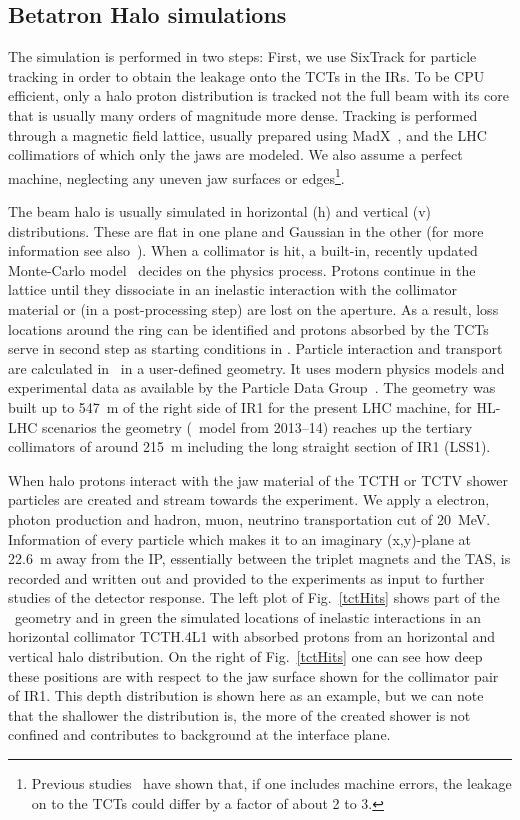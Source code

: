\subsection{Betatron Halo simulations}
The simulation is performed in two steps: First, we use SixTrack for particle tracking in order to obtain the leakage onto the TCTs in the IRs. To be CPU efficient, only a halo proton distribution is tracked not the full beam with its core that is usually many orders of magnitude more dense. Tracking is performed through a magnetic field lattice, usually prepared using MadX~\cite{madx}, and the LHC collimatiors of which only the jaws are modeled. We also assume a perfect machine, neglecting any uneven jaw surfaces or edges\footnote{Previous studies~\cite{roderikSimMeasPaper} have shown that, if one includes machine errors, the leakage on to the TCTs could differ by a factor of about 2 to 3.}.

The beam halo is usually simulated in horizontal (h) and vertical (v) distributions. These are flat in one plane and Gaussian in the other (for more information see also~\cite{chiarasThesis}). When a collimator is hit, a built-in, recently updated Monte-Carlo model~\cite{claudiasThesis} decides on the physics process. Protons continue in the lattice until they dissociate in an inelastic interaction with the collimator material or (in a post-processing step) are lost on the aperture. As a result, loss locations around the ring can be identified and protons absorbed by the TCTs serve in second step as starting conditions in \fluka. Particle interaction and transport are calculated in \fluka~in a user-defined geometry. It uses modern physics models and experimental data as available by the Particle Data Group~\cite{pdg}. The geometry was built up to 547~m of the right side of IR1 for the present LHC machine, for HL-LHC scenarios the geometry (\fluka~model from 2013--14) reaches up the tertiary collimators of around 215~m including the long straight section of IR1 (LSS1).

When halo protons interact with the jaw material of the TCTH or TCTV shower particles are created and stream towards the experiment. We apply a electron, photon production and hadron, muon, neutrino transportation cut of 20~MeV. Information of every particle which makes it to an imaginary (x,y)-plane at 22.6~m away from the IP, essentially between the triplet magnets and the TAS, is recorded and written out and provided to the experiments as input to further studies of the detector response. The left plot of Fig.~\ref{tctHits} shows part of the \fluka~geometry and in green the simulated locations of inelastic interactions in an horizontal collimator TCTH.4L1 with absorbed protons from an horizontal and vertical halo distribution. On the right of Fig.~\ref{tctHits} one can see how deep these positions are with respect to the jaw surface shown for the collimator pair of IR1. This depth distribution is shown here as an example, but we can note that the shallower the distribution is, the more of the created shower is not confined and contributes to background at the interface plane.

